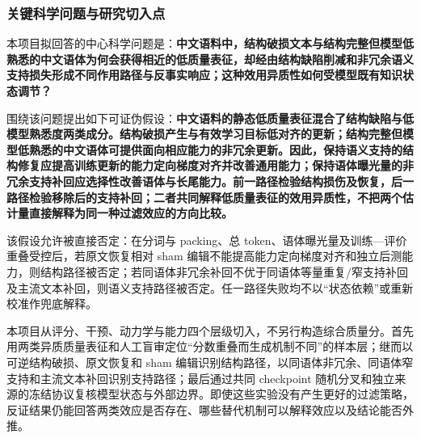 \subsubsection{关键科学问题与研究切入点}

本项目拟回答的中心科学问题是：\textbf{中文语料中，结构破损文本与结构完整但模型低熟悉的中文语体为何会获得相近的低质量表征，却经由结构缺陷削减和非冗余语义支持损失形成不同作用路径与反事实响应；这种效用异质性如何受模型既有知识状态调节？}

围绕该问题提出如下可证伪假设：\textbf{中文语料的静态低质量表征混合了结构缺陷与低模型熟悉度两类成分。结构破损产生与有效学习目标低对齐的更新；结构完整但模型低熟悉的中文语体可提供面向相应能力的非冗余更新。因此，保持语义支持的结构修复应提高训练更新的能力定向梯度对齐并改善通用能力；保持语体曝光量的非冗余支持补回应选择性改善语体与长尾能力。前一路径检验结构损伤及恢复，后一路径检验移除后的支持补回；二者共同解释低质量表征的效用异质性，不把两个估计量直接解释为同一种过滤效应的方向比较。}

该假设允许被直接否定：在分词与 packing、总 token、语体曝光量及训练—评价重叠受控后，若原文恢复相对 sham 编辑不能提高能力定向梯度对齐和独立后测能力，则结构路径被否定；若同语体非冗余补回不优于同语体等量重复/窄支持补回及主流文本补回，则语义支持路径被否定。任一路径失败均不以“状态依赖”或重新校准作兜底解释。

本项目从评分、干预、动力学与能力四个层级切入，不另行构造综合质量分。首先用两类异质质量表征和人工盲审定位“分数重叠而生成机制不同”的样本层；继而以可逆结构破损、原文恢复和 sham 编辑识别结构路径，以同语体非冗余、同语体窄支持和主流文本补回识别支持路径；最后通过共同 checkpoint 随机分叉和独立来源的冻结协议复核模型状态与外部边界。即使这些实验没有产生更好的过滤策略，反证结果仍能回答两类效应是否存在、哪些替代机制可以解释效应以及结论能否外推。
